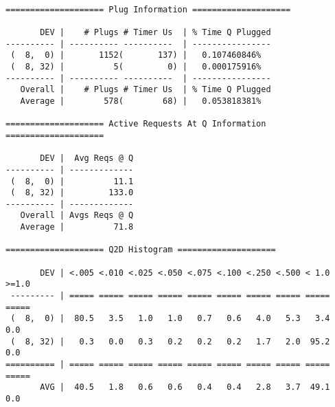 \begin{verbatim}

==================== Plug Information ====================

       DEV |    # Plugs # Timer Us  | % Time Q Plugged
---------- | ---------- ----------  | ----------------
 (  8,  0) |       1152(       137) |   0.107460846%
 (  8, 32) |          5(         0) |   0.000175916%
---------- | ---------- ----------  | ----------------
   Overall |    # Plugs # Timer Us  | % Time Q Plugged
   Average |        578(        68) |   0.053818381%

==================== Active Requests At Q Information ====================

       DEV |  Avg Reqs @ Q
---------- | -------------
 (  8,  0) |          11.1
 (  8, 32) |         133.0
---------- | -------------
   Overall | Avgs Reqs @ Q
   Average |          71.8

==================== Q2D Histogram ====================

       DEV | <.005 <.010 <.025 <.050 <.075 <.100 <.250 <.500 < 1.0 >=1.0
 --------- | ===== ===== ===== ===== ===== ===== ===== ===== ===== =====
 (  8,  0) |  80.5   3.5   1.0   1.0   0.7   0.6   4.0   5.3   3.4   0.0
 (  8, 32) |   0.3   0.0   0.3   0.2   0.2   0.2   1.7   2.0  95.2   0.0
========== | ===== ===== ===== ===== ===== ===== ===== ===== ===== =====
       AVG |  40.5   1.8   0.6   0.6   0.4   0.4   2.8   3.7  49.1   0.0

\end{verbatim}
